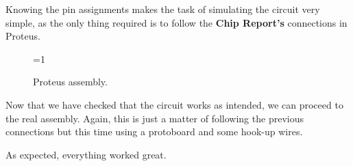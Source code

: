 Knowing the pin assignments makes the task of simulating the circuit very simple, as the only thing required is to follow the \textbf{Chip Report's} connections in Proteus.

\begin{figure}[H]
    \centering
    
    \ifnum\value{ANIMATION}=1 {
    } 
    \fi
    
    \caption{Proteus assembly.}
    \label{fig:PROTEUS_TEMP}
\end{figure}

Now that we have checked that the circuit works as intended, we can proceed to the real assembly. Again, this is just a matter of following the previous connections but this time using a protoboard and some hook-up wires. \medskip

As expected, everything worked great.

\newpage
